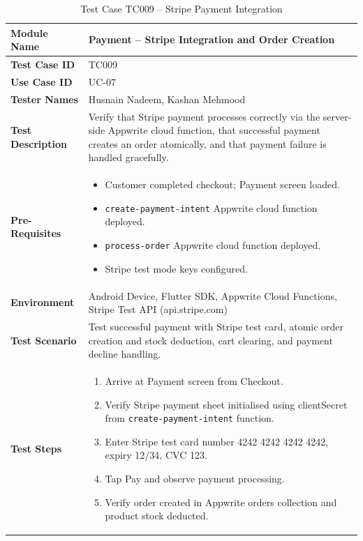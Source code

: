 {\renewcommand{\arraystretch}{1.15}
\small
\setlength{\LTleft}{\fill}
\setlength{\LTright}{\fill}
\begin{longtable}{|p{3.2cm}|p{10.8cm}|}
\caption{Test Case TC009 -- Stripe Payment Integration} \label{tab:tc009} \\
\hline
\textbf{Module Name} & Payment -- Stripe Integration and Order Creation \\ \hline
\textbf{Test Case ID} & TC009 \\ \hline
\textbf{Use Case ID} & UC-07 \\ \hline
\textbf{Tester Names} & Husnain Nadeem, Kashan Mehmood \\ \hline
\textbf{Test Description} & Verify that Stripe payment processes correctly via the server-side Appwrite cloud function, that successful payment creates an order atomically, and that payment failure is handled gracefully. \\ \hline
\textbf{Pre-Requisites} &
\begin{itemize}[leftmargin=*,noitemsep]
\item Customer completed checkout; Payment screen loaded.
\item \texttt{create-payment-intent} Appwrite cloud function deployed.
\item \texttt{process-order} Appwrite cloud function deployed.
\item Stripe test mode keys configured.
\end{itemize} \\ \hline
\textbf{Environment} & Android Device, Flutter SDK, Appwrite Cloud Functions, Stripe Test API (api.stripe.com) \\ \hline
\textbf{Test Scenario} & Test successful payment with Stripe test card, atomic order creation and stock deduction, cart clearing, and payment decline handling. \\ \hline
\textbf{Test Steps} &
\begin{enumerate}[leftmargin=*,noitemsep]
\item Arrive at Payment screen from Checkout.
\item Verify Stripe payment sheet initialised using clientSecret from \texttt{create-payment-intent} function.
\item Enter Stripe test card number 4242 4242 4242 4242, expiry 12/34, CVC 123.
\item Tap Pay and observe payment processing.
\item Verify order created in Appwrite orders collection and product stock deducted.

\end{enumerate}
\end{longtable}}
